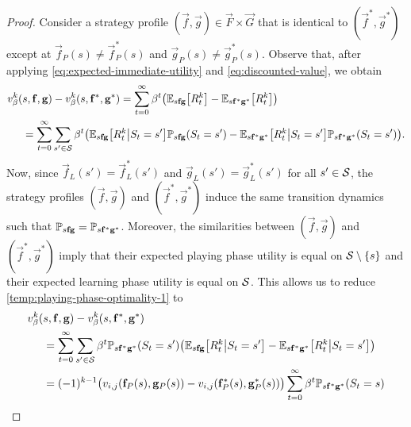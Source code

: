     \begin{proof}
        Consider a strategy profile $(\vec{f}, \vec{g}) \in \vec{F} \times \vec{G}$ that is identical to $(\vec{f}^*, \vec{g}^*)$ except at $\vec{f}_P(s) \neq \vec{f}^*_P(s)$ and $\vec{g}_P(s) \neq \vec{g}^*_P(s)$.
        Observe that, after applying \eqref{eq:expected-immediate-utility} and \eqref{eq:discounted-value}, we obtain
        \begin{equation}  \label{temp:playing-phase-optimality-1}
        \begin{split}
            v^k_\beta(& s, \mathbf{f}, \mathbf{g}) - v^k_\beta(s, \mathbf{f}^*, \mathbf{g}^*)
                = \sum_{t = 0}^\infty \beta^t \big( \mathbb{E}_{s \mathbf{f} \mathbf{g}} \big[R^k_t\big] - \mathbb{E}_{s \mathbf{f}^* \mathbf{g}^*} \big[R^k_t\big]\big) \\
                & = \sum_{t = 0}^\infty \sum_{s' \in \mathcal{S}} \beta^t \big( \mathbb{E}_{s \mathbf{f} \mathbf{g}} \big[ R^k_t \big| S_t = s' \big] \mathbb{P}_{s \mathbf{f} \mathbf{g}} (S_t = s') - \mathbb{E}_{s \mathbf{f}^* \mathbf{g}^*} \big[ R^k_t \big| S_t = s' \big] \mathbb{P}_{s \mathbf{f}^* \mathbf{g}^*} (S_t = s')\big).
        \end{split}
        \end{equation}
        Now, since $\vec{f}_L(s') = \vec{f}^*_L(s')$ and $\vec{g}_L(s') = \vec{g}^*_L(s')$ for all $s' \in \mathcal{S}$, the strategy profiles $(\vec{f}, \vec{g})$ and $(\vec{f}^*, \vec{g}^*)$ induce the same transition dynamics such that $\mathbb{P}_{s \mathbf{f} \mathbf{g}} = \mathbb{P}_{s \mathbf{f}^* \mathbf{g}^*}$.
        Moreover, the similarities between $(\vec{f}, \vec{g})$ and $(\vec{f}^*, \vec{g}^*)$ imply that their expected playing phase utility is equal on $\mathcal{S} \setminus \{s\}$ and their expected learning phase utility is equal on $\mathcal{S}$.
        This allows us to reduce \eqref{temp:playing-phase-optimality-1} to
        \begin{equation}  \label{temp:playing-phase-optimality-2}
        \begin{split}
            v^k_\beta(& s, \vec{f}, \vec{g}) - v^k_\beta(s, \vec{f}^*, \vec{g}^*) \\
                & = \sum_{t = 0}^\infty \sum_{s' \in \calS} \beta^t \PP_{s \vec{f}^* \vec{g}^*} (S_t = s') \big( \EE_{s \vec{f} \vec{g}} \big[ R^k_t \big| S_t = s' \big] - \EE_{s \vec{f}^* \vec{g}^*} \big[ R^k_t \big| S_t = s' \big]\big) \\
                & = (-1)^{k - 1} \big( v_{i, j}(\vec{f}_P(s), \vec{g}_P(s)) - v_{i, j}(\vec{f}^*_P(s), \vec{g}^*_P(s)) \big) \sum_{t = 0}^\infty \beta^t \PP_{s \vec{f}^* \vec{g}^*} (S_t = s)
        \end{split}

\end{equation}
\end{proof}
